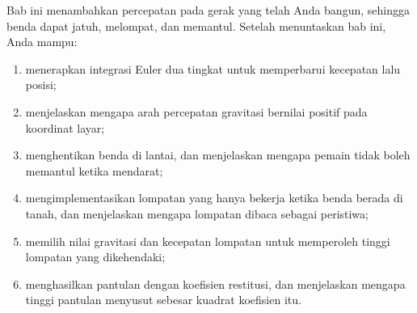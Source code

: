\begin{tujuanbox}
Bab ini menambahkan percepatan pada gerak yang telah Anda bangun, sehingga
benda dapat jatuh, melompat, dan memantul. Setelah menuntaskan bab ini, Anda
mampu:
\begin{enumerate}
  \item menerapkan integrasi Euler dua tingkat untuk memperbarui kecepatan
        lalu posisi;
  \item menjelaskan mengapa arah percepatan gravitasi bernilai positif pada
        koordinat layar;
  \item menghentikan benda di lantai, dan menjelaskan mengapa pemain tidak
        boleh memantul ketika mendarat;
  \item mengimplementasikan lompatan yang hanya bekerja ketika benda berada di
        tanah, dan menjelaskan mengapa lompatan dibaca sebagai peristiwa;
  \item memilih nilai gravitasi dan kecepatan lompatan untuk memperoleh tinggi
        lompatan yang dikehendaki;
  \item menghasilkan pantulan dengan koefisien restitusi, dan menjelaskan
        mengapa tinggi pantulan menyusut sebesar kuadrat koefisien itu.
\end{enumerate}
\end{tujuanbox}
